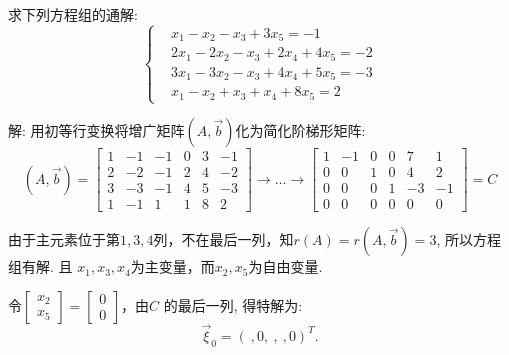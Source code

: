 \begin{eg}
求下列方程组的通解:
\begin{displaymath}\left\{\begin{aligned}
&x_1-x_2-x_3+3x_5=-1\\
&2x_1-2x_2-x_3+2x_4+4x_5=-2\\
&3x_1-3x_2-x_3+4x_4+5x_5=-3\\
&x_1-x_2+x_3+x_4+8x_5=2\end{aligned}\right.\end{displaymath}

解: 用初等行变换将增广矩阵$(A, \vec{b})$化为简化阶梯形矩阵:
\begin{displaymath}
(A,\vec{b})=\begin{bmatrix}1&-1&-1&0&3&-1\\2&-2&-1&2&4&-2\\3&-3&-1&4&5&-3\\1&-1&
1&1&8&2\end{bmatrix}\rightarrow\dots\rightarrow\begin{bmatrix}1&-1&0&0&7&1\\0&0&
1&0&4&2\\0&0&0&1&-3&-1\\0&0&0&0&0&0\end{bmatrix}=C
\end{displaymath}

由于主元素位于第$1,3,4$列，不在最后一列，知$r(A) = r(A, \vec{b}) = 3$,  所以方程组有解. 且 $x_1, x_3, x_4$为主变量，而$x_2, x_5$为自由变量.

令$\begin{bmatrix}x_2\\ x_5\end{bmatrix}=\begin{bmatrix}0\\0\end{bmatrix}$，由$C$ 的最后一列, 得特解为:
\begin{displaymath}
\vec{\xi}_0=(\ ,0,\ ,\ ,0)^T.
\end{displaymath}


\end{eg}
